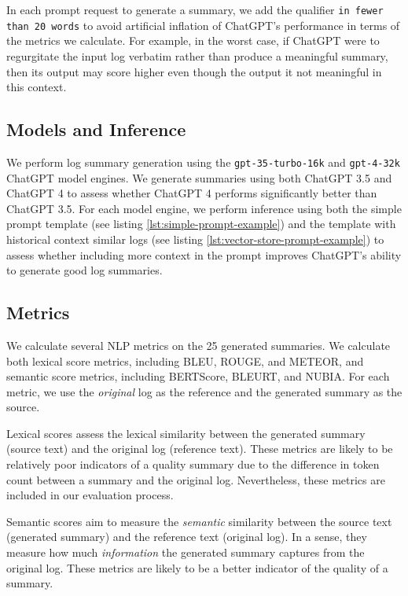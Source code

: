 \documentclass[conference]{IEEEtran}
\begin{document}
In each prompt request to generate a summary, we add the qualifier \lstinline{in fewer than 20 words} to avoid artificial inflation of ChatGPT's performance in terms of the metrics we calculate. For example, in the worst case, if ChatGPT were to regurgitate the input log verbatim rather than produce a meaningful summary, then its output may score higher even though the output it not meaningful in this context.

\subsection{Models and Inference} \label{subsec:inference}

We perform log summary generation using the \lstinline{gpt-35-turbo-16k} and \lstinline{gpt-4-32k} ChatGPT model engines. We generate summaries using both ChatGPT 3.5 and ChatGPT 4 to assess whether ChatGPT 4 performs significantly better than ChatGPT 3.5. For each model engine, we perform inference using both the simple prompt template (see listing \ref{lst:simple-prompt-example}) and the template with historical context similar logs (see listing \ref{lst:vector-store-prompt-example}) to assess whether including more context in the prompt improves ChatGPT's ability to generate good log summaries.

\subsection{Metrics} \label{subsec:metrics}

We calculate several NLP metrics on the 25 generated summaries. We calculate both lexical score metrics, including BLEU, ROUGE, and METEOR, and semantic score metrics, including BERTScore, BLEURT, and NUBIA. For each metric, we use the \textit{original} log as the reference and the generated summary as the source.

Lexical scores assess the lexical similarity between the generated summary (source text) and the original log (reference text). These metrics are likely to be relatively poor indicators of a quality summary due to the difference in token count between a summary and the original log. Nevertheless, these metrics are included in our evaluation process.

Semantic scores aim to measure the \textit{semantic} similarity between the source text (generated summary) and the reference text (original log). In a sense, they measure how much \textit{information} the generated summary captures from the original log. These metrics are likely to be a better indicator of the quality of a summary.
\end{document}
